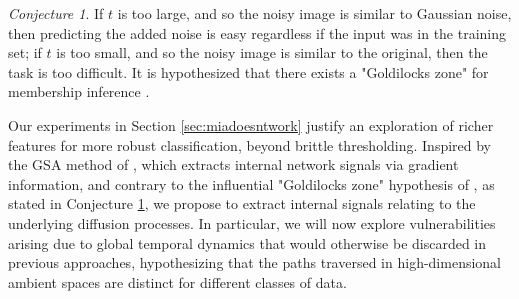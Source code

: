 \documentclass{article}
\DeclareRobustCommand{\mybox}[2][gray!10]{%
	\begin{tcolorbox}[   %
		left=0pt,
		right=0pt,
		top=0pt,
		bottom=0pt,
		colback=#1,
		colframe=#1,
		width=\dimexpr\textwidth\relax, 
		enlarge left by=0mm,
		boxsep=5pt,
		arc=0pt,outer arc=0pt,
		]
		#2
	\end{tcolorbox}
}
\theoremstyle{remark}
\newtheorem{conjecture}{Conjecture}
\begin{document}

\mybox[gray!8]{\begin{conjecture}\label{conj:goldilocks} If $t$ is too large, and so the noisy image is similar to Gaussian noise, then predicting the added noise is easy regardless if the input was in the training set; if $t$ is too small, and so the noisy image is similar to the original, then the task is too difficult. It is hypothesized that there exists a "Goldilocks zone" for membership inference \citep{10.5555/3620237.3620531}.
\end{conjecture}}

Our experiments in Section \ref{sec:miadoesntwork} justify an exploration of richer features for more robust classification, beyond brittle thresholding. Inspired by the GSA method of \citet{pang2025whitebox}, which extracts internal network signals via gradient information, and contrary to the influential "Goldilocks zone" hypothesis of \citet{10.5555/3620237.3620531}, as stated in Conjecture \ref{conj:goldilocks}, we propose to extract internal signals relating to the underlying diffusion processes. In particular, we will now explore vulnerabilities arising due to global temporal dynamics that would otherwise be discarded in previous approaches, hypothesizing that the paths traversed in high-dimensional ambient spaces are distinct for different classes of data.
\end{document}
